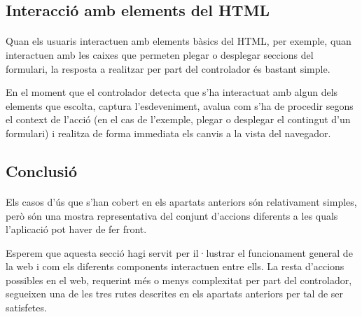     \subsection{Interacció amb elements del HTML}

    \paragraph{}
    Quan els usuaris interactuen amb elements bàsics del HTML, per exemple, quan interactuen amb les caixes que permeten plegar o desplegar seccions del formulari, la resposta a realitzar per part del controlador és bastant simple.

    En el moment que el controlador detecta que s'ha interactuat amb algun dels elements que escolta, captura l'esdeveniment, avalua com s'ha de procedir segons el context de l'acció (en el cas de l’exemple, plegar o desplegar el contingut d'un formulari) i realitza de forma immediata els canvis a la vista del navegador.


    \subsection{Conclusió}

    \paragraph{}
    Els casos d'ús que s'han cobert en els apartats anteriors són relativament simples, però són una mostra representativa del conjunt d'accions diferents a les quals l'aplicació pot haver de fer front.

    Esperem que aquesta secció hagi servit per il·lustrar el funcionament general de la web i com els diferents components interactuen entre ells. La resta d’accions possibles en el web, requerint més o menys complexitat per part del controlador, segueixen una de les tres rutes descrites en els apartats anteriors per tal de ser satisfetes.
